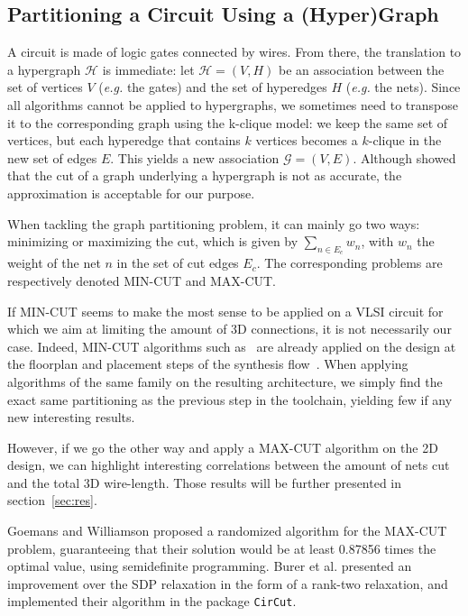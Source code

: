 \documentclass[conference]{IEEEtran}
\begin{document}
\subsection{Partitioning a Circuit Using a (Hyper)Graph}
A circuit is made of logic gates connected by wires.
From there, the translation to a hypergraph $\mathcal{H}$ is immediate: let $\mathcal{H} = (V, H)$ be an association between the set of vertices $V$ (\textit{e.g.} the gates) and the set of hyperedges $H$ (\textit{e.g.} the nets). %
Since all algorithms cannot be applied to hypergraphs, we sometimes need to transpose it to the corresponding graph using the k-clique model: we keep the same set of vertices, but each hyperedge that contains $k$ vertices becomes a $k$-clique in the new set of edges $E$.
This yields a new association $\mathcal{G} = (V, E)$.
Although \cite{IhlerEdmund;WagnerDorothea;Wagner1993} showed that the cut of a graph underlying a hypergraph is not as accurate, the approximation is acceptable for our purpose.

When tackling the graph partitioning problem, it can mainly go two ways: minimizing or maximizing the cut, which is given by $\sum_{n \in E_c} w_{n}$, with $w_n$ the weight of the net $n$ in the set of cut edges $E_c$.
The corresponding problems are respectively denoted MIN-CUT and MAX-CUT.

If MIN-CUT seems to make the most sense to be applied on a VLSI circuit for which we aim at limiting the amount of 3D connections, it is not necessarily our case.
Indeed, MIN-CUT algorithms such as~\cite{Karypis1999} are already applied on the design at the floorplan and placement steps of the synthesis flow~\cite{KahngAndrewB.Lienig2011}.
When applying algorithms of the same family on the resulting architecture, we simply find the exact same partitioning as the previous step in the toolchain, yielding few if any new interesting results.

However, if we go the other way and apply a MAX-CUT algorithm on the 2D design, we can highlight interesting correlations between the amount of nets cut and the total 3D wire-length.
Those results will be further presented in section~\ref{sec:res}.



Goemans and Williamson \cite{Goemans1995} proposed a randomized algorithm for the MAX-CUT problem, guaranteeing that their solution would be at least 0.87856 times the optimal value, using semidefinite programming. Burer et al. \cite{Burer2000} presented an improvement over the SDP relaxation in the form of a rank-two relaxation, and implemented their algorithm in the package \texttt{CirCut}.
\end{document}
